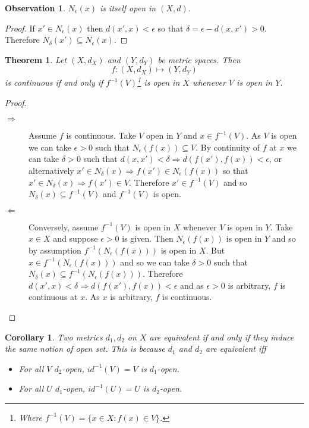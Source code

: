 \documentclass{notes}
\theoremstyle{plain}
\newtheorem{theorem}[proposition]{Theorem}
\newtheorem{corollary}[proposition]{Corollary}
\newtheorem{observation}[proposition]{Observation}
\begin{document}
\begin{observation}
$ N_{\epsilon}(x) $ is itself open in $ (X,d) $.
\end{observation}

\begin{proof}
If $ x' \in N_{\epsilon}(x) $ then $d(x',x)<\epsilon$ so that
$\delta = \epsilon - d(x,x')>0$.
Therefore ${N_{\delta}(x') \subseteq N_{\epsilon}(x)}$.
\end{proof}

\begin{theorem}\label{thm:open-cont}
Let $ (X,d_{X}) $ and $ (Y,d_{Y}) $ be metric spaces.
Then \[
f\colon (X,d_{X}) \mapsto (Y,d_{Y})
\]
is continuous if and only  if $ f^{-1}(V) $\footnote{Where
$f^{-1}(V) = \{ x \in X : f(x) \in V \}$.}
is open in $ X $ whenever $ V $ is open in $ Y $.
\end{theorem}

\begin{proof}
\

\begin{description}
\item[$\Rightarrow$] Assume $ f $ is continuous. Take $ V $ open in
  $Y$ and $ x \in f^{-1}(V) $.  As $ V $ is open we can take $
  \epsilon>0 $ such that $N_{\epsilon}(f(x)) \subseteq V$.  By
  continuity of $ f $ at $ x $ we can take $ \delta>0 $ such that
$d(x,x')< \delta \Rightarrow d(f(x'),f(x)) < \epsilon$,
or alternatively
$x' \in N_{\delta}(x) \Rightarrow f(x') \in N_{\epsilon}(f(x))$
so that $x' \in N_{\delta}(x) \Rightarrow f(x') \in V$.
Therefore $ x' \in f^{-1}(V) $ and so
$N_{\delta}(x) \subseteq f^{-1}(V)$
and $ f^{-1}(V) $ is open.

\item[$\Leftarrow$] Conversely, assume $ f^{-1}(V) $ is open in $ X 
$ whenever $ V $ is open in $ Y $.
Take $ x \in X $ and suppose $ \epsilon>0 $ is given.
Then $ N_{\epsilon}(f(x)) $ is open in $ Y $ and so by assumption
$f^{-1}(N_{\epsilon}(f(x)))$
is open in $ X $. But $x \in f^{-1}(N_{\epsilon}(f(x)))$ and so we can
take $ \delta>0 $ such that
$N_{\delta}(x) \subseteq f^{-1}(N_{\epsilon}(f(x)))$.
Therefore
$d(x',x)<\delta \Rightarrow d(f(x'),f(x)) < \epsilon$
and as $ \epsilon>0 $ is arbitrary, $ f $ is continuous at $ x $.
As $ x $ is arbitrary, $ f $ is continuous.
\end{description}
\end{proof}

\begin{corollary}
Two metrics $ d_{1}, d_{2}  $ on $ X $ are equivalent if and only 
if they induce the same notion of open set.
This is because $ d_{1} $ and $ d_{2} $ are equivalent iff
\begin{itemize}
\item For all $ V $ $ d_{2} $-open, $ id^{-1}(V)=V $ is $ d_{1} 
$-open.
\item For all $ U $ $ d_{1} $-open, $ id^{-1}(U)=U $ is $ d_{2} 
$-open.
\end{itemize}
\end{corollary}
\end{document}
